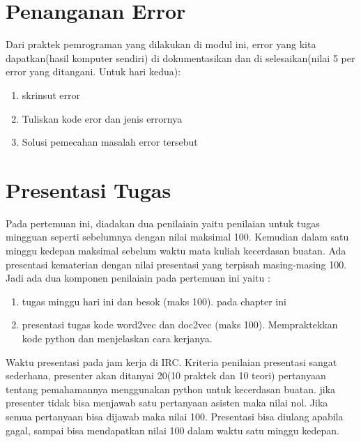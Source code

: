 \section{Penanganan Error}
Dari praktek pemrograman yang dilakukan di modul ini, error yang kita dapatkan(hasil komputer sendiri) di dokumentasikan dan di selesaikan(nilai 5 per error yang ditangani. Untuk hari kedua):

\begin{enumerate}
	\item skrinsut error
	\item Tuliskan kode eror dan jenis errornya
	\item Solusi pemecahan masalah error tersebut
\end{enumerate}

\section{Presentasi Tugas}
Pada pertemuan ini, diadakan dua penilaiain yaitu penilaian untuk tugas mingguan seperti sebelumnya dengan nilai maksimal 100. Kemudian dalam satu minggu kedepan maksimal sebelum waktu mata kuliah kecerdasan buatan. Ada presentasi kematerian dengan nilai presentasi yang terpisah masing-masing 100. Jadi ada dua komponen penilaiain pada pertemuan ini yaitu :
\begin{enumerate}
	\item tugas minggu hari ini dan besok (maks 100). pada chapter ini
	\item presentasi tugas kode word2vec dan doc2vec (maks 100). Mempraktekkan kode python dan menjelaskan cara kerjanya.
\end{enumerate}
Waktu presentasi pada jam kerja di IRC. Kriteria penilaian presentasi sangat sederhana, presenter akan ditanyai 20(10 praktek dan 10 teori) pertanyaan tentang pemahamannya menggunakan python untuk kecerdasan buatan. jika presenter tidak bisa menjawab satu pertanyaan asisten maka nilai nol. Jika semua pertanyaan bisa dijawab maka nilai 100. Presentasi bisa diulang apabila gagal, sampai bisa mendapatkan nilai 100 dalam waktu satu minggu kedepan.


